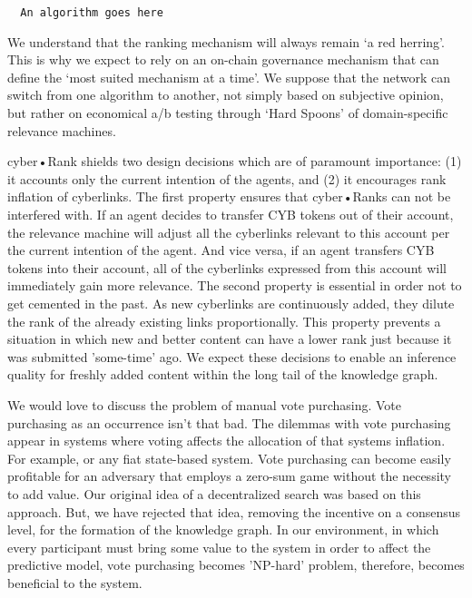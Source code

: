 \documentclass[8pt,oneside]{amsart}
\newcommand{\linkgreen}[2]{\href{#1}{\color{green}{#2}}}
\begin{document}
\begin{Abstract}
\begin{lstlisting}
  An algorithm goes here
\end{lstlisting}

We understand that the ranking mechanism will always remain ‘a red herring’. This is why we expect to rely on an on-chain governance mechanism that can define the ‘most suited mechanism at a time’. We suppose that the network can switch from one algorithm to another, not simply based on subjective opinion, but rather on economical a/b testing through ‘Hard Spoons’ of domain-specific relevance machines.

cyber•Rank shields two design decisions which are of paramount importance: (1) it accounts only the current intention of the agents, and (2) it encourages rank inflation of cyberlinks. The first property ensures that cyber•Ranks can not be interfered with. If an agent decides to transfer CYB tokens out of their account, the relevance machine will adjust all the cyberlinks relevant to this account per the current intention of the agent. And vice versa, if an agent transfers CYB tokens into their account, all of the cyberlinks expressed from this account will immediately gain more relevance. The second property is essential in order not to get cemented in the past. As new cyberlinks are continuously added, they dilute the rank of the already existing links proportionally. This property prevents a situation in which new and better content can have a lower rank just because it was submitted 'some-time' ago. We expect these decisions to enable an inference quality for freshly added content within the long tail of the knowledge graph.

We would love to discuss the problem of manual vote purchasing. Vote purchasing as an occurrence isn't that bad. The dilemmas with vote purchasing appear in systems where voting affects the allocation of that systems inflation. For example, \linkgreen{http://ipfs.io/ipfs/QmepU77tqMAHHuiSASUvUnu8f8ENuPF2Kfs97WjLn8vAS3}{Steem}
or any fiat state-based system. Vote purchasing can become easily profitable for an adversary that employs a zero-sum game without the necessity to add value. Our original idea of a decentralized search was based on this approach. But, we have rejected that idea, removing the incentive on a consensus level, for the formation of the knowledge graph. In our environment, in which every participant must bring some value to the system in order to affect the predictive model, vote purchasing becomes 'NP-hard' problem, therefore, becomes beneficial to the system.


\end{Abstract}
\end{document}
